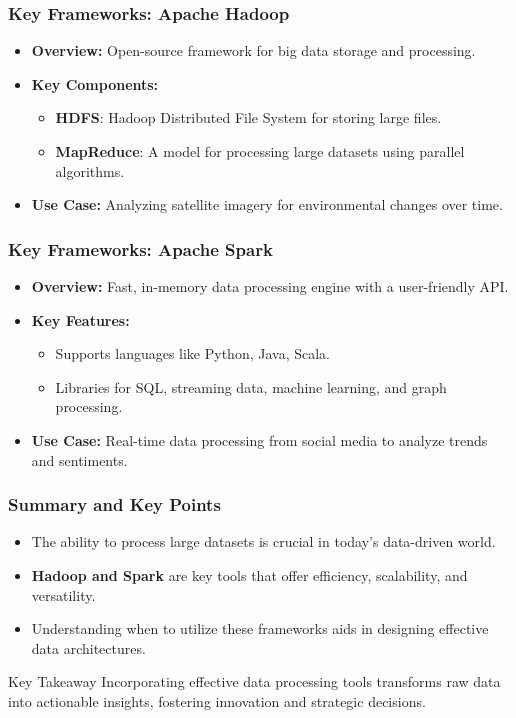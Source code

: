 \documentclass[aspectratio=169]{beamer}
\begin{document}
\begin{frame}[fragile]
    \frametitle{Key Frameworks: Apache Hadoop}
    \begin{itemize}
        \item  \textbf{Overview:} Open-source framework for big data storage and processing.
        \item \textbf{Key Components:}
            \begin{itemize}
                \item \textbf{HDFS}: Hadoop Distributed File System for storing large files.
                \item \textbf{MapReduce}: A model for processing large datasets using parallel algorithms.
            \end{itemize}
        \item \textbf{Use Case:} Analyzing satellite imagery for environmental changes over time.
    \end{itemize}
\end{frame}

\begin{frame}[fragile]
    \frametitle{Key Frameworks: Apache Spark}
    \begin{itemize}
        \item \textbf{Overview:} Fast, in-memory data processing engine with a user-friendly API.
        \item \textbf{Key Features:}
            \begin{itemize}
                \item Supports languages like Python, Java, Scala.
                \item Libraries for SQL, streaming data, machine learning, and graph processing.
            \end{itemize}
        \item \textbf{Use Case:} Real-time data processing from social media to analyze trends and sentiments.
    \end{itemize}
\end{frame}

\begin{frame}[fragile]
    \frametitle{Summary and Key Points}
    \begin{itemize}
        \item The ability to process large datasets is crucial in today's data-driven world.
        \item \textbf{Hadoop and Spark} are key tools that offer efficiency, scalability, and versatility.
        \item Understanding when to utilize these frameworks aids in designing effective data architectures.
    \end{itemize}
    \begin{block}{Key Takeaway}
        Incorporating effective data processing tools transforms raw data into actionable insights, fostering innovation and strategic decisions.
    \end{block}
\end{frame}
\end{document}
